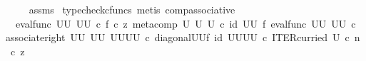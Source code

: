 \begin{isabellebody}
\ \ \ \ \isamarkupfalse%
\ assms\ \isamarkupfalse%
{\isacharparenleft}{\kern0pt}typecheck{\isacharunderscore}{\kern0pt}cfuncs{\isacharcomma}{\kern0pt}\ metis\ comp{\isacharunderscore}{\kern0pt}associative{}{\isacharparenright}{\kern0pt}\isanewline
\ \ \isamarkupfalse%
\ \isamarkupfalse%
\ {\isachardoublequoteopen}{\isachardot}{\kern0pt}{\isachardot}{\kern0pt}{\isachardot}{\kern0pt}\ {\isacharequal}{\kern0pt}\ {\isacharparenleft}{\kern0pt}eval{\isacharunderscore}{\kern0pt}func\ {\isacharparenleft}{\kern0pt}U\isactrlbsup U\isactrlesup {\isacharparenright}{\kern0pt}\ {\isacharparenleft}{\kern0pt}U\isactrlbsup U\isactrlesup {\isacharparenright}{\kern0pt}{\isacharparenright}{\kern0pt}\ {\isasymcirc}\isactrlsub c\ {\isasymlangle}f\ {\isasymcirc}\isactrlsub c\ z{\isacharcomma}{\kern0pt}\ {\isacharparenleft}{\kern0pt}{\isacharparenleft}{\kern0pt}meta{\isacharunderscore}{\kern0pt}comp\ U\ U\ U\ {\isasymcirc}\isactrlsub c\ {\isacharparenleft}{\kern0pt}id\ {\isacharparenleft}{\kern0pt}U\isactrlbsup U\isactrlesup {\isacharparenright}{\kern0pt}\ {\isasymtimes}\isactrlsub f\ eval{\isacharunderscore}{\kern0pt}func\ {\isacharparenleft}{\kern0pt}U\isactrlbsup U\isactrlesup {\isacharparenright}{\kern0pt}\ {\isacharparenleft}{\kern0pt}U\isactrlbsup U\isactrlesup {\isacharparenright}{\kern0pt}{\isacharparenright}{\kern0pt}\ {\isasymcirc}\isactrlsub c\ {\isacharparenleft}{\kern0pt}associate{\isacharunderscore}{\kern0pt}right\ {\isacharparenleft}{\kern0pt}U\isactrlbsup U\isactrlesup {\isacharparenright}{\kern0pt}\ {\isacharparenleft}{\kern0pt}U\isactrlbsup U\isactrlesup {\isacharparenright}{\kern0pt}\ {\isacharparenleft}{\kern0pt}{\isacharparenleft}{\kern0pt}U\isactrlbsup U\isactrlesup {\isacharparenright}{\kern0pt}\isactrlbsup U\isactrlbsup U\isactrlesup \isactrlesup {\isacharparenright}{\kern0pt}{\isacharparenright}{\kern0pt}\ {\isasymcirc}\isactrlsub c\ {\isacharparenleft}{\kern0pt}diagonal{\isacharparenleft}{\kern0pt}U\isactrlbsup U\isactrlesup {\isacharparenright}{\kern0pt}{\isasymtimes}\isactrlsub f\ id\ {\isacharparenleft}{\kern0pt}{\isacharparenleft}{\kern0pt}U\isactrlbsup U\isactrlesup {\isacharparenright}{\kern0pt}\isactrlbsup U\isactrlbsup U\isactrlesup \isactrlesup {\isacharparenright}{\kern0pt}{\isacharparenright}{\kern0pt}{\isacharparenright}{\kern0pt}\isactrlsup {\isasymsharp}\ {\isasymcirc}\isactrlsub c\ ITER{\isacharunderscore}{\kern0pt}curried\ U{\isacharparenright}{\kern0pt}\ {\isasymcirc}\isactrlsub c\ {\isacharparenleft}{\kern0pt}n\ \ {\isasymcirc}\isactrlsub c\ z{\isacharparenright}{\kern0pt}{\isasymrangle}{\isachardoublequoteclose}\isanewline

\end{isabellebody}
